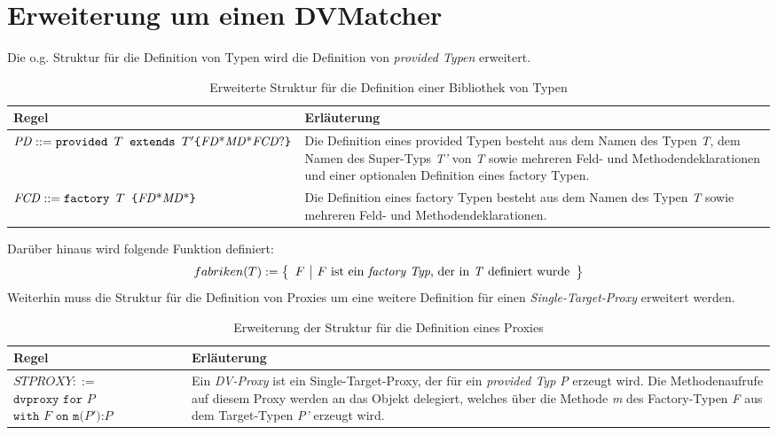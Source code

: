 \documentclass[a4paper,12pt]{article}
\begin{document}
\section{Erweiterung um einen DVMatcher}
Die o.g. Struktur für die Definition von Typen wird die Definition von \emph{provided Typen} erweitert.
\begin{table}[H]
\centering
\begin{tabular}{|p{5cm}|p{9cm}|}
\hline
\hline
\centering\textbf{Regel} & \textbf{Erläuterung} \\
\hline
\hline
$\mathit{PD} ::= \newline \texttt{provided } T \texttt{ extends }T' \newline \texttt{\{} \mathit{FD}\text{*} \mathit{MD}\text{*} \mathit{FCD}\text{?}\texttt{\}}$& Die Definition eines provided Typen besteht aus dem Namen des Typen \emph{T}, dem Namen des Super-Typs \emph{T'} von \emph{T} sowie mehreren Feld- und Methodendeklarationen und einer optionalen Definition eines factory Typen.\\
\hline
$\mathit{FCD} ::= \texttt{factory }T \texttt{ \{}\newline \mathit{FD}\text{*} \mathit{MD}\text{*} \texttt{\}} $& Die Definition eines factory Typen besteht aus dem Namen des Typen \emph{T} sowie mehreren Feld- und Methodendeklarationen.\\
\hline
\hline
\end{tabular}
\caption{Erweiterte Struktur für die Definition einer Bibliothek von Typen}
 \label{tab:extTDv}
\end{table}
\noindent
Darüber hinaus wird folgende Funktion definiert:
\begin{gather*}
fabriken(T) :=  \left\{ 
				\begin{array}{l|l}
					F & F \text{ ist ein \emph{factory Typ}, der in \emph{T} definiert wurde}
				\end{array}
              \right\}
\end{gather*}
Weiterhin muss die Struktur für die Definition von Proxies um eine weitere Definition für einen \emph{Single-Target-Proxy} erweitert werden.
\begin{table}[H]
\centering
\begin{tabular}{|p{4.5cm}|p{9.5cm}|}
\hline
\centering\textbf{Regel} & \textbf{Erläuterung} \\
\hline
\hline
$\mathit{STPROXY} ::=$\newline 
$\texttt{dvproxy }  \texttt{for } P$\newline
$\texttt{with } F \texttt{ on } \texttt{m(}\mathit{P'}\texttt{):}\mathit{P}$ & Ein \emph{DV-Proxy} ist ein Single-Target-Proxy, der für ein \emph{provided Typ P} erzeugt wird. Die Methodenaufrufe auf diesem Proxy werden an das Objekt delegiert, welches über die Methode \emph{m} des Factory-Typen \emph{F} aus dem Target-Typen \emph{P'} erzeugt wird.\\
\hline
\hline
\end{tabular}
\caption{Erweiterung der Struktur für die Definition eines Proxies}
 \label{tab:extPDv}
\end{table}
\end{document}
